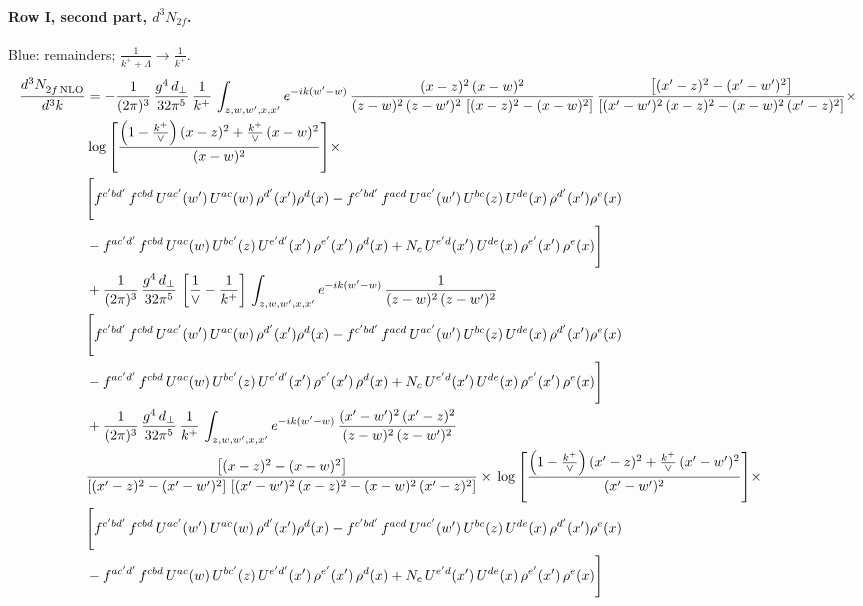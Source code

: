 \documentclass[10pt]{article}
\numberwithin{equation}{section}
\newcommand{\new}[1]{{\color{blue}#1}}
\begin{document}
\paragraph{Row I, second part, $d^3N_{2f}$.}
\new{Blue}: remainders; $\frac{1}{k^++\Lambda}\to\frac{1}{k^+}$.
\begin{align}
    \frac{d^{3}N_{2f\,\rm NLO}^{\rm}}{d^{3}k}  & =   - \frac{1}{(2\pi)^{3}}\, \frac{g^{4}\,d_{\perp}}{32\pi^{5}}\,\frac{1}{k^{+}}\,\int_{z,w,w^{\prime},x,x'} e^{-ik(w^{\prime}-w)}\,\frac{(x-z)^{2}\, (x-w)^{2}}{(z-w)^{2}\, (z-w')^{2}\,\left[(x-z)^{2} - (x-w)^{2}\right]}\,\frac{\left[(x'-z)^{2}-(x'-w')^{2}\right]}{\left[(x'-w')^{2}\, (x-z)^{2} - (x-w)^{2}\, (x'-z)^{2}\right]}\times\notag \\ & \log{\left[\frac{\left(1-\frac{k^{+}}{\vee}\right)(x-z)^{2}+\frac{k^{+}}{\vee}\,(x-w)^{2}}{(x-w)^{2}}\right]}\times\notag \\ & \Bigg[f^{c'bd'}\,f^{cbd}\, U^{ac'}(w')\,U^{ac}(w)\,\rho^{d'}(x')\rho^{d}(x)- f^{c'bd'}\,f^{acd}\,U^{ac'}(w')\,U^{bc}(z)\,U^{de}(x)\,\rho^{d'}(x')\rho^{e}(x) \notag \\ & -f^{ac'd'}\,f^{cbd}\,U^{ac}(w)\,U^{bc'}(z)\,U^{e'd'}(x')\,\rho^{e'}(x')\,\rho^{d}(x) +N_{c}\,U^{e'd}(x')\,U^{de}(x)\,\rho^{e'}(x')\,\rho^{e}(x)\Bigg]  \notag \\
& + \frac{1}{(2\pi)^{3}}\, \frac{g^{4}\,d_{\perp}}{32\pi^{5}}\,\left[\frac{1}{\vee} - \frac{1}{k^{+}}\right]\,\int_{z,w,w^{\prime},x,x'} e^{-ik(w^{\prime}-w)}\,\frac{1}{(z-w)^{2}\, (z-w')^{2}}\notag \\ & \Bigg[f^{c'bd'}\,f^{cbd}\, U^{ac'}(w')\,U^{ac}(w)\,\rho^{d'}(x')\rho^{d}(x)- f^{c'bd'}\,f^{acd}\,U^{ac'}(w')\,U^{bc}(z)\,U^{de}(x)\,\rho^{d'}(x')\rho^{e}(x) \notag \\ & -f^{ac'd'}\,f^{cbd}\,U^{ac}(w)\,U^{bc'}(z)\,U^{e'd'}(x')\,\rho^{e'}(x')\,\rho^{d}(x) +N_{c}\,U^{e'd}(x')\,U^{de}(x)\,\rho^{e'}(x')\,\rho^{e}(x)\Bigg]  \notag \\
& + \frac{1}{(2\pi)^{3}}\, \frac{g^{4}\,d_{\perp}}{32\pi^{5}}\,\frac{1}{k^{+}}\,\int_{z,w,w^{\prime},x,x'} e^{-ik(w^{\prime}-w)}\,\frac{(x'-w')^{2}\, (x'-z)^{2}}{(z-w)^{2}\, (z-w')^{2}}\notag \\ & \frac{\left[(x-z)^{2} - (x-w)^{2}\right]}{\left[(x'-z)^{2} - (x'-w')^{2}\right]\, \left[(x'-w')^{2}\, (x - z)^{2} - (x-w)^{2}\,(x'-z)^{2}\right]}\times\, \log{\left[\frac{\left(1-\frac{k^{+}}{\vee}\right)(x'-z)^{2}+\frac{k^{+}}{\vee}\,(x'-w')^{2}}{(x'-w')^{2}}\right]}\times \notag \\ &  \Bigg[f^{c'bd'}\,f^{cbd}\, U^{ac'}(w')\,U^{ac}(w)\,\rho^{d'}(x')\rho^{d}(x)- f^{c'bd'}\,f^{acd}\,U^{ac'}(w')\,U^{bc}(z)\,U^{de}(x)\,\rho^{d'}(x')\rho^{e}(x) \notag \\ & -f^{ac'd'}\,f^{cbd}\,U^{ac}(w)\,U^{bc'}(z)\,U^{e'd'}(x')\,\rho^{e'}(x')\,\rho^{d}(x) +N_{c}\,U^{e'd}(x')\,U^{de}(x)\,\rho^{e'}(x')\,\rho^{e}(x)\Bigg] \label{eq:F:G2I2f}
\end{align}
\end{document}

